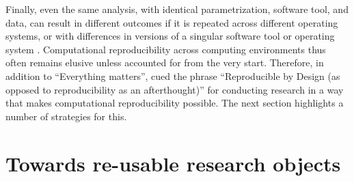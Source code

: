 Finally, even the same analysis, with identical parametrization, software tool, and data, can result in different outcomes if it is repeated across different operating systems, or with differences in versions of a singular software tool or operating system \citep{gronenschild2012effects} \citep{glatard2015reproducibility}.
Computational reproducibility across computing environments thus often remains elusive unless accounted for from the very start.
Therefore, in addition to ``Everything matters'',  \citet{kennedy2019everything} cued the phrase ``Reproducible by Design (as opposed to reproducibility as an afterthought)'' for conducting research in a way that makes computational reproducibility possible.
The next section highlights a number of strategies for this.



\section{Towards re-usable research objects}


